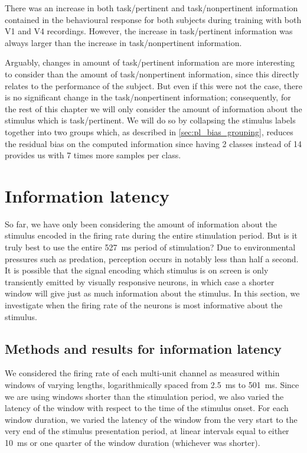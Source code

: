There was an increase in both task\-/pertinent and task\-/nonpertinent information contained in the behavioural response for both subjects during training with both \ac{V1} and \ac{V4} recordings.
However, the increase in task\-/pertinent information was always larger than the increase in task\-/nonpertinent information.

Arguably, changes in amount of task\-/pertinent information are more interesting to consider than the amount of task\-/nonpertinent information, since this directly relates to the performance of the subject.
But even if this were not the case, there is no significant change in the task\-/nonpertinent information; consequently, for the rest of this chapter we will only consider the amount of information about the stimulus which is task\-/pertinent.
We will do so by collapsing the stimulus labels together into two groups which, as described in \autoref{sec:pl_bias_grouping}, reduces the residual bias on the computed information since having \num{2} classes instead of \num{14} provides us with \num{7} times more samples per class.


\section{Information latency}
\label{sec:pl_info_latency}

So far, we have only been considering the amount of information about the stimulus encoded in the firing rate during the entire stimulation period.
But is it truly best to use the entire \SI{527}{\milli\second} period of stimulation?
Due to environmental pressures such as predation, perception occurs in notably less than half a second.
It is possible that the signal encoding which stimulus is on screen is only transiently emitted by visually responsive neurons, in which case a shorter window will give just as much information about the stimulus.
In this section, we investigate when the firing rate of the neurons is most informative about the stimulus.


\subsection{Methods and results for information latency}

We considered the firing rate of each multi-unit channel as measured within windows of varying lengths, logarithmically spaced from \SI{2.5}{\milli\second} to \SI{501}{\milli\second}.
Since we are using windows shorter than the stimulation period, we also varied the latency of the window with respect to the time of the stimulus onset.
For each window duration, we varied the latency of the window from the very start to the very end of the stimulus presentation period, at linear intervals equal to either \SI{10}{\milli\second} or one quarter of the window duration (whichever was shorter).

